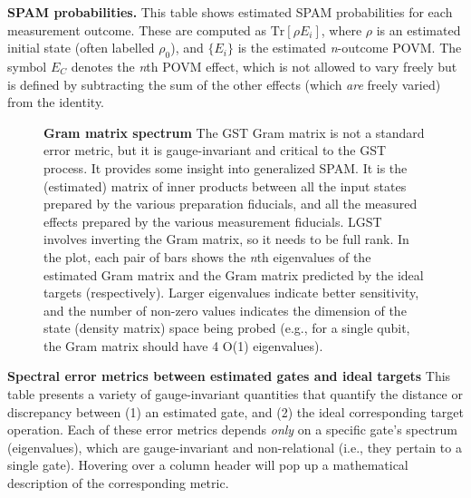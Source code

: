 \documentclass{article}[11pt]
\newcommand{\putfield}[2]{#2}
\begin{document}
{\begin{table}[h]
  \begin{center}
    \begin{adjustbox}{max width=\textwidth}
      \putfield{bestGatesetSpamParametersTable}{}
    \end{adjustbox}
    \caption{\textbf{SPAM probabilities.} This table shows estimated SPAM probabilities for each measurement outcome.  These are computed as $\mathrm{Tr}[\rho E_i]$, where $\rho$ is an estimated initial state (often labelled $\rho_0$), and $\{E_i\}$ is the estimated \emph{n}-outcome POVM.  The symbol $E_C$ denotes the \emph{n}th POVM effect, which is not allowed to vary freely but is defined by subtracting the sum of the other effects (which \emph{are} freely varied) from the identity.}
  \end{center}
\end{table}

        
\begin{figure}[h]
  \begin{center}
    \begin{adjustbox}{max width=\textwidth}
      \putfield{gramBarPlot}{}
    \end{adjustbox}
    \caption{\textbf{Gram matrix spectrum} The GST Gram matrix is not a standard error metric, but it is gauge-invariant and critical to the GST process.  It provides some insight into generalized SPAM.  It is the (estimated) matrix of inner products between all the input states prepared by the various preparation fiducials, and all the measured effects prepared by the various measurement fiducials.  LGST involves inverting the Gram matrix, so it needs to be full rank.  In the plot, each pair of bars shows the \emph{n}th  eigenvalues of the estimated Gram matrix and the Gram matrix predicted by the ideal targets (respectively).  Larger eigenvalues indicate better sensitivity, and the number of non-zero values indicates the dimension of the state (density matrix) space being probed (e.g., for a single qubit, the Gram matrix should have 4 O(1) eigenvalues).}
  \end{center}
\end{figure}


\begin{table}[h]
  \begin{center}
    \begin{adjustbox}{max width=\textwidth}
      \putfield{bestGatesVsTargetTable_gi}{}
    \end{adjustbox}
    \caption{\textbf{Spectral error metrics between estimated gates and ideal targets} This table presents a variety of gauge-invariant quantities that quantify the distance or discrepancy between (1) an estimated gate, and (2) the ideal corresponding target operation.  Each of these error metrics depends \emph{only} on a specific gate's spectrum (eigenvalues), which are gauge-invariant and non-relational (i.e., they pertain to a single gate).  Hovering over a column header will pop up a mathematical description of the corresponding metric.}
  \end{center}
\end{table}

}
\end{document}
